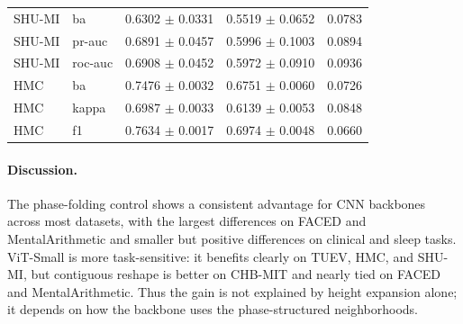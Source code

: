\begin{table}[tbp]
\begin{tabular}{@{}l l c c c@{}}
SHU-MI & ba & 0.6302 $\pm$ 0.0331 & 0.5519 $\pm$ 0.0652 & 0.0783 \\
SHU-MI & pr-auc & 0.6891 $\pm$ 0.0457 & 0.5996 $\pm$ 0.1003 & 0.0894 \\
SHU-MI & roc-auc & 0.6908 $\pm$ 0.0452 & 0.5972 $\pm$ 0.0910 & 0.0936 \\
HMC & ba & 0.7476 $\pm$ 0.0032 & 0.6751 $\pm$ 0.0060 & 0.0726 \\
HMC & kappa & 0.6987 $\pm$ 0.0033 & 0.6139 $\pm$ 0.0053 & 0.0848 \\
HMC & f1 & 0.7634 $\pm$ 0.0017 & 0.6974 $\pm$ 0.0048 & 0.0660 \\
\bottomrule\end{tabular}\end{table}

\paragraph{Discussion.}
The phase-folding control shows a consistent advantage for CNN backbones across
most datasets, with the largest differences on FACED and MentalArithmetic and
smaller but positive differences on clinical and sleep tasks. ViT-Small is more
task-sensitive: it benefits clearly on TUEV, HMC, and SHU-MI, but contiguous
reshape is better on CHB-MIT and nearly tied on FACED and MentalArithmetic.
Thus the gain is not explained by height expansion alone; it depends on how the
backbone uses the phase-structured neighborhoods.
